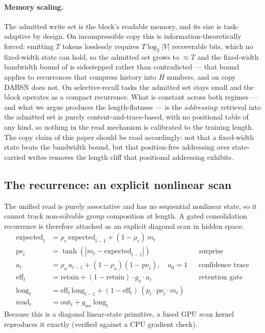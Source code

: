 \documentclass[11pt]{article}
\newcommand{\model}{DABSN}
\begin{document}
\paragraph{Memory scaling.} The admitted write set is the block's readable
memory, and its size is task-adaptive by design. On incompressible copy this
is information-theoretically forced: emitting $T$ tokens losslessly requires
$T \log_2 |V|$ recoverable bits, which no fixed-width state can hold, so the
admitted set grows to $\approx T$ and the fixed-width bandwidth bound of
\citet{jelassi2024repeat} is sidestepped rather than contradicted --- that
bound applies to recurrences that compress history into $H$ numbers, and on
copy \model{} does not. On selective-recall tasks the admitted set stays
small and the block operates as a compact recurrence. What is constant across
both regimes --- and what we argue produces the length-flatness --- is the
\emph{addressing}: retrieval into the admitted set is purely
content-and-trace-based, with no positional table of any kind, so nothing in
the read mechanism is calibrated to the training length. The copy claim of
this paper should be read accordingly: not that a fixed-width state beats the
bandwidth bound, but that position-free addressing over state-carried writes
removes the length cliff that positional addressing exhibits.

\subsection{The recurrence: an explicit nonlinear scan}
\label{sec:recurrence}

The unified read is purely associative and has no sequential nonlinear state,
so it cannot track non-solvable group composition at length. A gated
consolidation recurrence is therefore attached as an explicit diagonal scan
in hidden space:
\begin{align}
\mathrm{expected}_t &= \rho_e\, \mathrm{expected}_{t-1} + (1-\rho_e)\, m_t \nonumber\\
\mathrm{pe}_t &= \tanh(|m_t - \mathrm{expected}_{t-1}|) && \text{surprise} \nonumber\\
a_t &= \rho_a\, a_{t-1} + (1-\rho_a)(1 - \mathrm{pe}_t), \quad a_0 = 1 && \text{confidence trace} \nonumber\\
\mathrm{eff}_t &= \mathrm{retain} + (1 - \mathrm{retain})\cdot g_a \cdot a_t && \text{retention gate} \nonumber\\
\mathrm{long}_t &= \mathrm{eff}_t\, \mathrm{long}_{t-1} + (1 - \mathrm{eff}_t)\,(p_t \cdot \mathrm{pe}_t \cdot m_t) \nonumber\\
\mathrm{read}_t &= \mathrm{out}_t + g_{\mathrm{rec}}\, \mathrm{long}_t
\end{align}
Because this is a diagonal linear-state primitive, a fused GPU scan kernel
reproduces it exactly (verified against a CPU gradient check).
\end{document}
